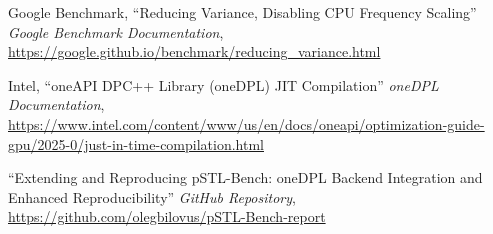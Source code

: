 \documentclass[sigconf]{acmart}
\begin{document}
\begin{thebibliography}{1}
      Google Benchmark, ``Reducing Variance, Disabling CPU Frequency Scaling'' \textit{Google Benchmark Documentation},
      \url{https://google.github.io/benchmark/reducing_variance.html}

      Intel, ``oneAPI DPC++ Library (oneDPL) JIT Compilation'' \textit{oneDPL Documentation},
      \url{https://www.intel.com/content/www/us/en/docs/oneapi/optimization-guide-gpu/2025-0/just-in-time-compilation.html}

      ``Extending and Reproducing pSTL-Bench: oneDPL Backend Integration and Enhanced Reproducibility'' \textit{GitHub Repository},
      \url{https://github.com/olegbilovus/pSTL-Bench-report}

\end{thebibliography}
\end{document}
